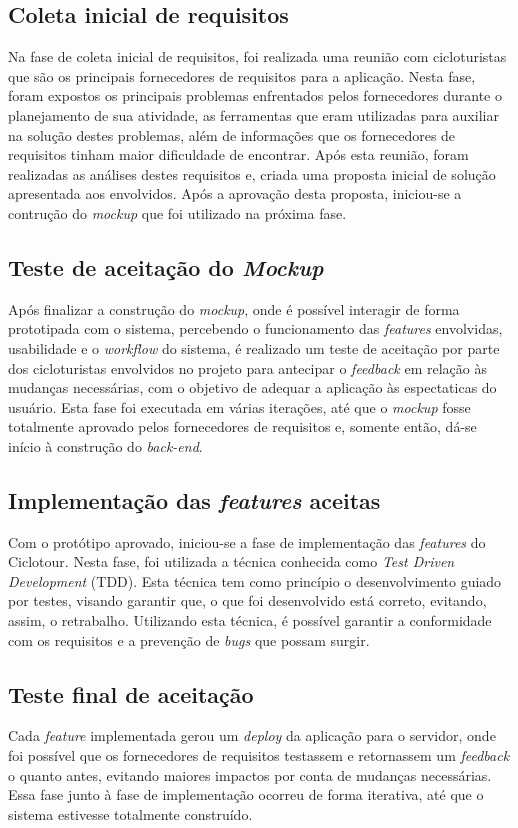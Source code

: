 \subsection{Coleta inicial de requisitos}
Na fase de coleta inicial de requisitos, foi realizada uma reunião com cicloturistas que são os principais fornecedores de requisitos para a 
aplicação. Nesta fase, foram expostos os principais problemas enfrentados pelos fornecedores durante o planejamento de sua atividade, as 
ferramentas que eram utilizadas para auxiliar na solução destes problemas, além de informações que os fornecedores de requisitos tinham maior
dificuldade de encontrar. Após esta reunião, foram realizadas as análises destes requisitos e, criada 
uma proposta inicial de solução apresentada aos envolvidos. 
Após a aprovação desta proposta, iniciou-se a contrução do \textit{mockup} que foi utilizado na próxima fase.

\subsection{Teste de aceitação do \textit{Mockup}}
Após finalizar a construção do \textit{mockup}, onde é possível interagir de forma prototipada com o sistema, percebendo o funcionamento das 
\textit{features} envolvidas, usabilidade e o \textit{workflow} do sistema, é realizado um teste de aceitação por parte dos 
cicloturistas envolvidos no projeto para antecipar o \textit{feedback} em relação às mudanças necessárias, com o objetivo de adequar a aplicação às 
espectaticas do usuário. Esta fase foi executada em várias iterações, até que o \textit{mockup} fosse totalmente aprovado pelos fornecedores de 
requisitos e, somente então, dá-se início à construção do \textit{back-end}.

\subsection{Implementação das \textit{features} aceitas}
Com o protótipo aprovado, iniciou-se a fase de implementação das \textit{features} do Ciclotour. Nesta fase, foi utilizada a técnica conhecida 
como \textit{Test Driven Development} (TDD). Esta técnica tem como princípio o desenvolvimento guiado por testes, visando garantir que, o que foi 
desenvolvido está correto, evitando, assim, o retrabalho. Utilizando esta técnica, é possível garantir a conformidade com os requisitos 
e a prevenção de \textit{bugs} que possam surgir. 

\subsection{Teste final de aceitação}
Cada \textit{feature} implementada gerou um \textit{deploy} da aplicação para o servidor, onde foi possível que os fornecedores de requisitos testassem
e retornassem um \textit{feedback} o quanto antes, evitando maiores impactos por conta de mudanças necessárias. Essa fase junto à fase de 
implementação ocorreu de forma iterativa, até que o sistema estivesse totalmente construído.

